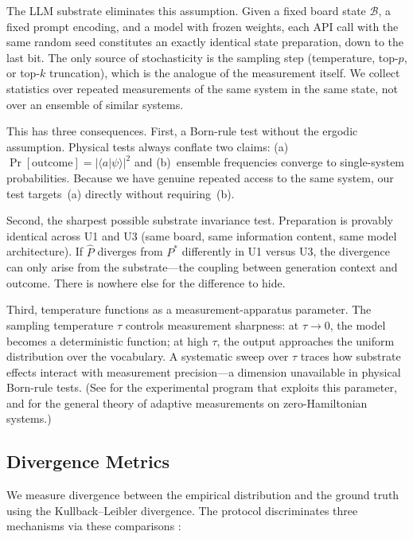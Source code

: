 \documentclass[12pt,a4paper]{article}
\begin{document}
The LLM substrate eliminates this assumption. Given a fixed board state $\mathcal{B}$, a fixed prompt encoding, and a model with frozen weights, each API call with the same random seed constitutes an exactly identical state preparation, down to the last bit. The only source of stochasticity is the sampling step (temperature, top-$p$, or top-$k$ truncation), which is the analogue of the measurement itself. We collect statistics over repeated measurements of the same system in the same state, not over an ensemble of similar systems.

This has three consequences. First, a Born-rule test without the ergodic assumption. Physical tests always conflate two claims: (a)~$\Pr[\text{outcome}] = |\langle a|\psi\rangle|^2$ and (b)~ensemble frequencies converge to single-system probabilities. Because we have genuine repeated access to the same system, our test targets~(a) directly without requiring~(b).

Second, the sharpest possible substrate invariance test. Preparation is provably identical across U1 and U3 (same board, same information content, same model architecture). If $\hat{P}$ diverges from $P^*$ differently in U1 versus U3, the divergence can only arise from the substrate---the coupling between generation context and outcome. There is nowhere else for the difference to hide.

Third, temperature functions as a measurement-apparatus parameter. The sampling temperature $\tau$ controls measurement sharpness: at $\tau \to 0$, the model becomes a deterministic function; at high $\tau$, the output approaches the uniform distribution over the vocabulary. A systematic sweep over $\tau$ traces how substrate effects interact with measurement precision---a dimension unavailable in physical Born-rule tests. (See \citealt{baldo2026} for the experimental program that exploits this parameter, and \citealt{WisemanMilburn2009} for the general theory of adaptive measurements on zero-Hamiltonian systems.)

\subsection{Divergence Metrics}
\label{sec:metrics}

We measure divergence between the empirical distribution and the ground truth using the Kullback--Leibler divergence. The protocol discriminates three mechanisms via these comparisons \citep{baldo2026}:
\end{document}
